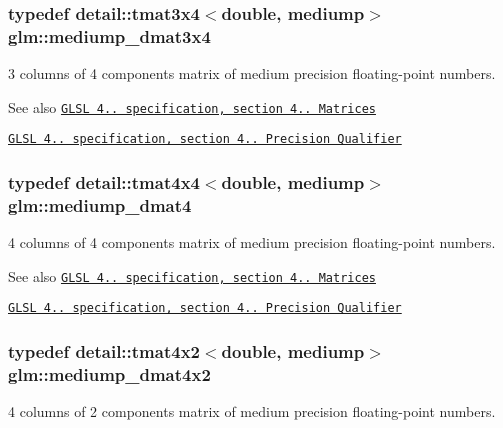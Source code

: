 \subsubsection[{\texorpdfstring{mediump\+\_\+dmat3x4}{mediump_dmat3x4}}]{\setlength{\rightskip}{0pt plus 5cm}typedef detail\+::tmat3x4$<$double, mediump$>$ {\bf glm\+::mediump\+\_\+dmat3x4}}\hypertarget{group__core__precision_gaedd814e706701200b13b86fc6fd7b373}{}\label{group__core__precision_gaedd814e706701200b13b86fc6fd7b373}
3 columns of 4 components matrix of medium precision floating-\/point numbers.

\begin{DoxySeeAlso}{See also}
\href{http://www.opengl.org/registry/doc/GLSLangSpec.4.20.8.pdf}{\tt G\+L\+SL 4.. specification, section 4.. Matrices} 

\href{http://www.opengl.org/registry/doc/GLSLangSpec.4.20.8.pdf}{\tt G\+L\+SL 4.. specification, section 4.. Precision Qualifier} 
\end{DoxySeeAlso}
\subsubsection[{\texorpdfstring{mediump\+\_\+dmat4}{mediump_dmat4}}]{\setlength{\rightskip}{0pt plus 5cm}typedef detail\+::tmat4x4$<$double, mediump$>$ {\bf glm\+::mediump\+\_\+dmat4}}\hypertarget{group__core__precision_ga73de517f040f7d50746bbe273a396685}{}\label{group__core__precision_ga73de517f040f7d50746bbe273a396685}
4 columns of 4 components matrix of medium precision floating-\/point numbers.

\begin{DoxySeeAlso}{See also}
\href{http://www.opengl.org/registry/doc/GLSLangSpec.4.20.8.pdf}{\tt G\+L\+SL 4.. specification, section 4.. Matrices} 

\href{http://www.opengl.org/registry/doc/GLSLangSpec.4.20.8.pdf}{\tt G\+L\+SL 4.. specification, section 4.. Precision Qualifier} 
\end{DoxySeeAlso}
\subsubsection[{\texorpdfstring{mediump\+\_\+dmat4x2}{mediump_dmat4x2}}]{\setlength{\rightskip}{0pt plus 5cm}typedef detail\+::tmat4x2$<$double, mediump$>$ {\bf glm\+::mediump\+\_\+dmat4x2}}\hypertarget{group__core__precision_ga03056b616496470371473cd5df4dc1f8}{}\label{group__core__precision_ga03056b616496470371473cd5df4dc1f8}
4 columns of 2 components matrix of medium precision floating-\/point numbers.

